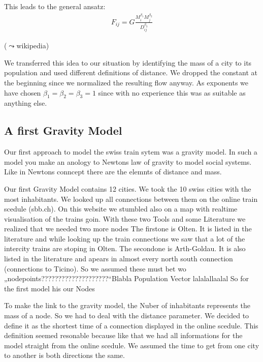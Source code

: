 \documentclass[11pt]{article}
\begin{document}
This leads to the general ansatz:
\begin{align*}
F_{ij}=G\frac{M_i^{\beta_1}M_j^{\beta_2}}{D_{ij}^{\beta_3}}
\end{align*}

($\leadsto$wikipedia)\newline

We transferred this idea to our situation by identifying the mass of a city to its population and used different definitions of distance. We dropped the constant at the beginning since we normalized the resulting flow anyway. As exponents we have chosen $\beta_1=\beta_2=\beta_3=1$ since with no experience this was as suitable as anything else.


\subsection{A first Gravity Model}

Our first approach to model the swiss train sytem was a gravity model. In such a model you make an anology to Newtons law of gravity to model social systems. Like in Newtons conncept there are the elemnts of distance and mass.

Our first Gravity Model contains 12 cities. We took the 10 swiss cities with the most inhabitants. We looked up all connections between them on the online train scedule (sbb.ch). On this website we stumbled also on a map with realtime visualisation of the trains goin. With these two Tools and some Literature we realized that we needed two more nodes %
The firstone is Olten. It is listed in the literature and while looking up the train connections we saw that a lot of the intercity trains are stoping in Olten. 
The secondone is Arth-Goldau. It is also listed in the literature and apears in almost every north south connection (connections to Ticino).
So we assumed these must bet wo „nodepoints????????????????????“Blabla Population Vector lalalallaalal
So for the first model his our Nodes

To make the link to the gravity model, the Nuber of inhabitants represents the mass of a node. So we had to deal with the distance parameter. We decided to define it as the shortest time of a connection displayed in the online scedule. This definition seemed resonable because like that we had all informations for the model straight from the online scedule. We assumed the time to get from one city to another is both directions the same.
\end{document}
